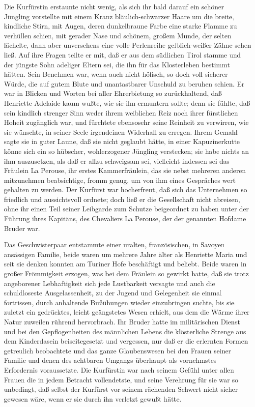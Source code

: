 \pagenum{[107]} Die Kurfürstin erstaunte nicht wenig, als sich ihr
bald darauf ein schöner Jüngling vorstellte mit einem Kranz
bläulich-schwarzer Haare um die breite, kindliche Stirn, mit Augen,
deren dunkelbraune Farbe eine starke Flamme zu verhüllen schien,
mit gerader Nase und schönem, großem Munde, der selten lächelte,
dann aber unversehens eine volle Perlenreihe gelblich-weißer Zähne
sehen ließ. Auf ihre Fragen teilte er mit, daß er aus dem südlichen
Tirol stamme und der jüngste Sohn adeliger Eltern sei, die ihn für
das Klosterleben bestimmt hätten. Sein Benehmen war, wenn auch
nicht höfisch, so doch voll sicherer Würde, die auf gutem Blute und
unantastbarer Unschuld zu beruhen schien. Er war in Blicken und
Worten bei aller Ehrerbietung so zurückhaltend, daß Henriette
Adelaide kaum wußte, wie sie ihn ermuntern sollte; denn sie fühlte,
daß sein kindlich strenger Sinn weder ihrem weiblichen Reiz noch
ihrer fürstlichen Hoheit zugänglich war, und fürchtete ebensosehr
seine Reinheit zu verwirren, wie sie wünschte, in seiner Seele
irgendeinen Widerhall zu erregen. Ihrem Gemahl sagte sie in guter
Laune, daß sie nicht geglaubt hätte, in einer Kapuzinerkutte könne
sich ein so hübscher, wohlerzogener Jüngling verstecken; sie habe
nichts an ihm auszusetzen, als daß er allzu schweigsam sei,
vielleicht indessen sei das Fräulein La Perouse, ihr erstes
Kammerfräulein, das sie nebst mehreren anderen mitzunehmen
beabsichtige, fromm genug, um von ihm eines Gespräches wert
gehalten zu werden. Der Kurfürst war hocherfreut, daß sich das
Unternehmen so friedlich und aussichtsvoll ordnete; doch ließ er
die Gesellschaft nicht abreisen, ohne ihr einen Teil seiner
Leibgarde zum Schutze beigeordnet zu haben unter der Führung ihres
Kapitäns, des Chevaliers La Perouse, der der genannten Hofdame
Bruder war.

\pagenum{[108]} Das Geschwisterpaar entstammte einer uralten,
französischen, in Savoyen ansässigen Familie, beide waren um
mehrere Jahre älter als Henriette Maria und seit sie denken konnten
am Turiner Hofe beschäftigt und beliebt. Beide waren in großer
Frömmigkeit erzogen, was bei dem Fräulein so gewirkt hatte, daß sie
trotz angeborener Lebhaftigkeit sich jede Lustbarkeit versagte und
auch die schuldloseste Ausgelassenheit, zu der Jugend und
Gelegenheit sie einmal fortrissen, durch anhaltende Bußübungen
wieder einzubringen suchte, bis sie zuletzt ein gedrücktes, leicht
geängstetes Wesen erhielt, aus dem die Wärme ihrer Natur zuweilen
rührend hervorbrach. Ihr Bruder hatte im militärischen Dienst und
bei den Gepflogenheiten des männlichen Lebens die klösterliche
Strenge aus dem Kinderdasein beiseitegesetzt und vergessen, nur daß
er die erlernten Formen getreulich beobachtete und das ganze
Glaubenswesen bei den Frauen seiner Familie und denen des achtbaren
Umgangs überhaupt als vornehmstes Erfordernis voraussetzte. Die
Kurfürstin war nach seinem Gefühl unter allen Frauen die in jedem
Betracht vollendetste, und seine Verehrung für sie war so
unbedingt, daß selbst der Kurfürst vor seinem rächenden Schwert
nicht sicher gewesen wäre, wenn er sie durch ihn verletzt gewußt
hätte.

